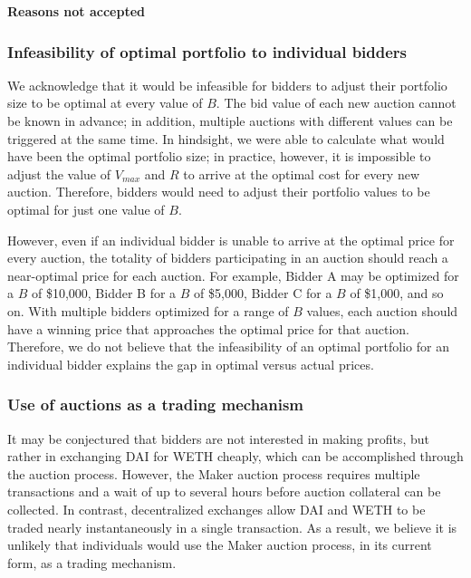 \documentclass[conference]{IEEEtran}
\begin{document}
\noindent \textbf{Reasons not accepted}
\subsubsection{Infeasibility of optimal portfolio to individual bidders} We acknowledge that it would be infeasible for bidders to adjust their portfolio size to be optimal at every value of $B$. The bid value of each new auction cannot be known in advance; in addition, multiple auctions with different values can be triggered at the same time. In hindsight, we were able to calculate what would have been the optimal portfolio size; in practice, however, it is impossible to adjust the value of $V_{max}$ and $R$ to arrive at the optimal cost for every new auction. Therefore, bidders would need to adjust their portfolio values to be optimal for just one value of $B$.

However, even if an individual bidder is unable to arrive at the optimal price for every auction, the totality of bidders participating in an auction should reach a near-optimal price for each auction. For example, Bidder A may be optimized for a $B$ of \$10,000, Bidder B for a $B$ of \$5,000, Bidder C for a $B$ of \$1,000, and so on. With multiple bidders optimized for a range of $B$ values, each auction should have a winning price that approaches the optimal price for that auction. Therefore, we do not believe that the infeasibility of an optimal portfolio for an individual bidder explains the gap in optimal versus actual prices.

\subsubsection{Use of auctions as a trading mechanism} It may be conjectured that bidders are not interested in making profits, but rather in exchanging DAI for WETH cheaply, which can be accomplished through the auction process. However, the Maker auction process requires multiple transactions and a wait of up to several hours before auction collateral can be collected. In contrast, decentralized exchanges allow DAI and WETH to be traded nearly instantaneously in a single transaction. As a result, we believe it is unlikely that individuals would use the Maker auction process, in its current form, as a trading mechanism.
\newline

\end{document}
